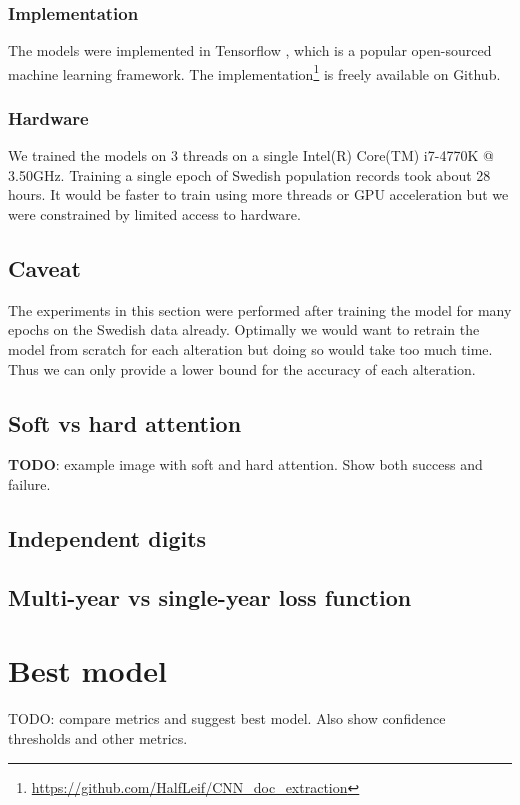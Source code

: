 \subsubsection{Implementation}
The models were implemented in Tensorflow \cite{Tensorflow}, which is a popular open-sourced machine learning framework. The implementation\footnote{\url{https://github.com/HalfLeif/CNN_doc_extraction}} is freely available on Github.

\subsubsection{Hardware}
We trained the models on 3 threads on a single Intel(R) Core(TM) i7-4770K @ 3.50GHz. Training a single epoch of Swedish population records took about 28 hours. It would be faster to train using more threads or GPU acceleration but we were constrained by limited access to hardware.


\subsection{Caveat}
The experiments in this section were performed after training the model for many epochs on the Swedish data already. Optimally we would want to retrain the model from scratch for each alteration but doing so would take too much time. Thus we can only provide a lower bound for the accuracy of each alteration.



\subsection{Soft vs hard attention}

\textbf{TODO}: example image with soft and hard attention. Show both success and failure.

\subsection{Independent digits} \label{sssec:ind_digits}

\subsection{Multi-year vs single-year loss function}


\section{Best model}

TODO: compare metrics and suggest best model. Also show confidence thresholds and other metrics.